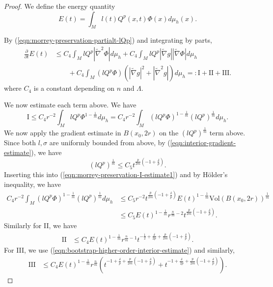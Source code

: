 \documentclass[12pt]{amsart}
\theoremstyle{plain}
\theoremstyle{plain}
\theoremstyle{definition}
\theoremstyle{remark}
\numberwithin{equation}{subsection}
\newcommand{\hdel}{\tilde{\nabla}}
\begin{document}
\begin{proof}
    We define the energy quantity
    \begin{equation*}
        E(t) = \int_{M} l(t)Q^p(x,t)\Phi(x)d\mu_h(x).
    \end{equation*}

    By (\ref{eqn:morrey-preservation-partialt-lQp}) and integrating by parts,
    \begin{align}\label{eqn:morrey-preservation-energy-derivative1}
        \frac{\partial}{\partial t} E(t) &\leq C_4\int_M lQ^p|\hdel^2\Phi| d\mu_h + C_4\int_M lQ^p|\hdel g||\hdel\Phi|d\mu_h \nonumber \\
        &\qquad + C_4\int_M (lQ^p\Phi)\left(|\hdel g|^2 + |\hdel^2 g|\right)d\mu_h =: \text{I} + \text{II} + \text{III}.
    \end{align}
    where $C_4$ is a constant depending on $n$ and $\Lambda$.
    
    We now estimate each term above. We have
    \begin{equation}\label{eqn:morrey-preservation-I-estimate1}
        \text{I} \leq C_4 r^{-2}\int_MlQ^p\Phi^{1-\frac{1}{m}}d\mu_h = C_4r^{-2}\int_M (lQ^p\Phi)^{1-\frac{1}{m}}(lQ^p)^\frac{1}{m}d\mu_h.
    \end{equation}
    We now apply the gradient estimate in $B(x_0,2r)$ on the $(lQ^p)^\frac{1}{m}$ term above. Since both $l, \sigma$ are uniformly bounded from above, by (\ref{eqn:interior-gradient-estimate}), we have
    \begin{equation*}
        (lQ^p)^\frac{1}{m} \leq C_5t^{\frac{p}{2m}\left(-1+\frac{\delta}{p}\right)}.
    \end{equation*}
    Inserting this into (\ref{eqn:morrey-preservation-I-estimate1}) and by H\"older's inequality, we have
    \begin{align}\label{eqn:morrey-preservation-I-estimate2}
        C_4r^{-2}\int_M(lQ^p\Phi)^{1-\frac{1}{m}}(lQ^p)^\frac{1}{m}d\mu_h &\leq C_5r^{-2}t^{\frac{p}{2m}\left(-1+\frac{\delta}{p}\right)}E(t)^{1-\frac{1}{m}}\text{Vol}({B(x_0,2r)})^\frac{1}{m} \nonumber \\
        &\leq C_5E(t)^{1-\frac{1}{m}}r^{\frac{n}{m}-2}t^{\frac{p}{2m}\left(-1+\frac{\delta}{p}\right)}.
    \end{align}
    Similarly for II, we have
    \begin{align}\label{eqn:morrey-preservation-II-estimate}
        \text{II} &\leq C_4E(t)^{1-\frac{1}{m}}r^{\frac{n}{m}-1}t^{-\frac{1}{2}+\frac{\delta}{2p}+\frac{p}{2m}\left(-1+\frac{\delta}{p}\right)}.
    \end{align}
    For III, we use (\ref{eqn:bootstrap-higher-order-interior-estimate}) and similarly,
    \begin{align}\label{eqn:morrey-preservation-III-estimate}
        \text{III} &\leq C_4E(t)^{1-\frac{1}{m}}r^\frac{n}{m}\left(t^{-1+\frac{\delta}{p}+\frac{p}{2m}\left(-1+\frac{\delta}{p}\right)} + t^{-1+\frac{\delta}{2p}+\frac{p}{2m}\left(-1+\frac{\delta}{p}\right)}\right).
    \end{align}


\end{proof}
\end{document}
